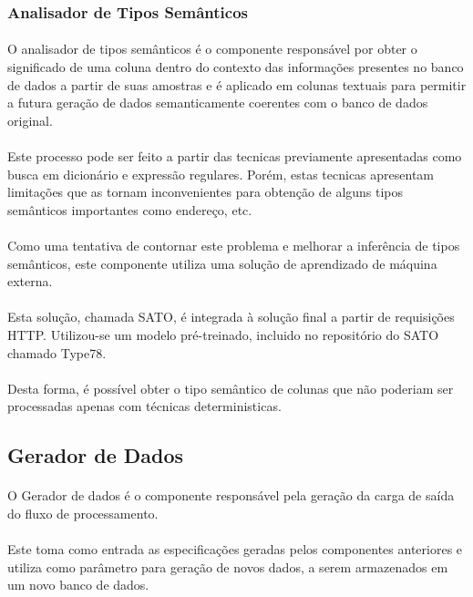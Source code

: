 \subsubsection{Analisador de Tipos Semânticos}

\paragraph{} O analisador de tipos semânticos é o componente responsável por obter o significado de uma coluna dentro do contexto das informações presentes no banco de dados a partir de suas amostras e é aplicado em colunas textuais para permitir a futura geração de dados semanticamente coerentes com o banco de dados original.

\paragraph{} Este processo pode ser feito a partir das tecnicas previamente apresentadas como busca em dicionário e expressão regulares. Porém, estas tecnicas apresentam limitações que as tornam inconvenientes para obtenção de alguns tipos semânticos importantes como endereço, etc.

\paragraph{} Como uma tentativa de contornar este problema e melhorar a inferência de tipos semânticos, este componente utiliza uma solução de aprendizado de máquina externa. 

\paragraph{} Esta solução, chamada SATO\cite{zhang2019sato}, é integrada à solução final a partir de requisições HTTP. Utilizou-se um modelo pré-treinado, incluido no repositório do SATO chamado Type78.

\paragraph{} Desta forma, é possível obter o tipo semântico de colunas que não poderiam ser processadas apenas com técnicas deterministicas.

\subsection{Gerador de Dados}

\paragraph{} O Gerador de dados é o componente responsável pela geração da carga de saída do fluxo de processamento. 

\paragraph{} Este toma como entrada as especificações geradas pelos componentes anteriores e utiliza como parâmetro para geração de novos dados, a serem armazenados em um novo banco de dados.

